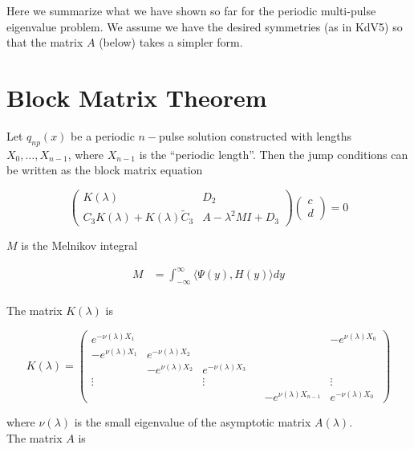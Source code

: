 \documentclass[12pt]{article}
\begin{document}
Here we summarize what we have shown so far for the periodic multi-pulse eigenvalue problem. We assume we have the desired symmetries (as in KdV5) so that the matrix $A$ (below) takes a simpler form.

\section{Block Matrix Theorem}

Let $q_{np}(x)$ be a periodic $n-$pulse solution constructed with lengths $X_0, \dots, X_{n-1}$, where $X_{n-1}$ is the ``periodic length''. Then the jump conditions can be written as the block matrix equation 

\begin{equation}\label{blockeq}
\begin{pmatrix}
K(\lambda) & D_2 \\
C_3 K(\lambda) + K(\lambda) \tilde{C}_3 & A - \lambda^2 MI + D_3
\end{pmatrix}
\begin{pmatrix}c \\ d \end{pmatrix} 
= 0
\end{equation}

$M$ is the Melnikov integral

\begin{align*}
M &= \int_{-\infty}^\infty \langle \Psi(y), H(y) \rangle dy \\
\end{align*}

The matrix $K(\lambda)$ is

\begin{equation}
K(\lambda) = 
\begin{pmatrix}
e^{-\nu(\lambda)X_1} & & & & & -e^{\nu(\lambda)X_0} \\
-e^{\nu(\lambda)X_1} & e^{-\nu(\lambda)X_2} \\
& -e^{\nu(\lambda)X_2} & e^{-\nu(\lambda)X_3} \\
\vdots & & \vdots & &&  \vdots \\
& & & & -e^{\nu(\lambda)X_{n-1}} & e^{-\nu(\lambda)X_0} 
\end{pmatrix}
\end{equation}

where $\nu(\lambda)$ is the small eigenvalue of the asymptotic matrix $A(\lambda)$. \\

The matrix $A$ is 
\end{document}
